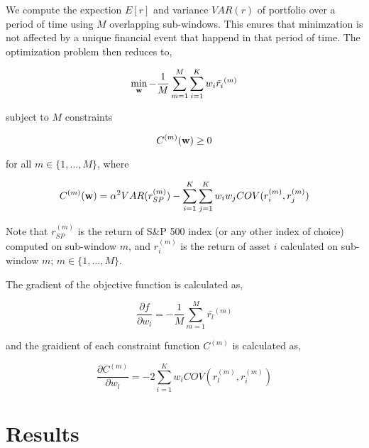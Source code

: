 \documentclass{article}
\begin{document}
We compute the expection $E[r]$ and variance $VAR(r)$ of portfolio
over a period of time using $M$ overlapping sub-windows. This enures that
minimzation is not affected by a unique financial event that happend
in that period of time. The optimization problem then reduces to,

\begin{equation}\label{eqn:objective-func-2}
  \min_{{\bf{w}}} -\frac{1}{M} \sum_{m=1}^{M} \sum_{i=1}^{K} w_i \bar{r_i}^{(m)}
\end{equation}

subject to $M$ constraints

\begin{equation}\label{eqn:constraints-2}
  C^{(m)}({\bf{w}}) \ge 0
\end{equation}

for all $m \in \{1,...,M\}$, where

\begin{equation}\label{eqn:constraints-def}
  C^{(m)}({\bf{w}}) = \alpha^2 VAR(r_{SP}^{(m)}) - \sum_{i=1}^{K} \sum_{j=1}^{K} w_i w_j COV(r_i^{(m)}, r_j^{(m)})
\end{equation}

Note that $r_{SP}^{(m)}$ is the return of S\&P 500 index (or any other
index of choice) computed on sub-window $m$, and $r_i^{(m)}$ is the
return of asset $i$ calculated on sub-window $m$; $m \in \{1,...,M\}$.

The gradient of the objective function is calculated as,

\begin{equation}\label{eqn:obj-gradient}
  \frac{\partial f}{\partial w_l} = -\frac{1}{M} \sum_{m=1}^{M} \bar{r_l}^{(m)}
\end{equation}

and the graidient of each constraint function $C^{(m)}$ is calculated as,

\begin{equation}\label{eqn:constraints-gradient}
  \frac{\partial C^{(m)}}{\partial w_l} = -2 \sum_{i=1}^{K} w_i COV(r_l^{(m)}, r_i^{(m)})
\end{equation}

\section{Results}\label{section:results}
\end{document}
